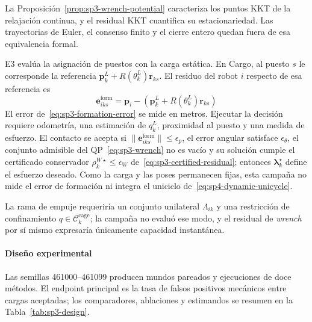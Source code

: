 La Proposición~\ref{prop:sp3-wrench-potential} caracteriza los puntos KKT de la relajación continua, y el residual KKT cuantifica su estacionariedad. Las trayectorias de Euler, el consenso finito y el cierre entero quedan fuera de esa equivalencia formal.

E3 evalúa la asignación de puestos con la carga estática. En Cargo, al puesto $s$ le corresponde la referencia $\boldsymbol p_k^L+R(\theta_k^L)\boldsymbol r_{ks}$. El residuo del robot $i$ respecto de esa referencia es
\begin{equation}
\label{eq:sp3-formation-error}
  \boldsymbol e_{iks}^{\mathrm{form}}
  =\boldsymbol p_i-
   \left(\boldsymbol p_k^L+R(\theta_k^L)\boldsymbol r_{ks}\right)
\end{equation}
El error de~\eqref{eq:sp3-formation-error} se mide en metros. Ejecutar la decisión requiere odometría, una estimación de $q_k^L$, proximidad al puesto y una medida de esfuerzo. El contacto se acepta si $\|\boldsymbol e_{iks}^{\mathrm{form}}\|\leq\epsilon_p$, el error angular satisface $\epsilon_\theta$, el conjunto admisible del QP~\eqref{eq:sp3-wrench} no es vacío y su solución cumple el certificado conservador $\rho_k^{W\star}\leq\epsilon_W$ de~\eqref{eq:sp3-certified-residual}; entonces $\boldsymbol\lambda_k^\star$ define el esfuerzo deseado. Como la carga y las poses permanecen fijas, esta campaña no mide el error de formación ni integra el uniciclo de~\eqref{eq:sp4-dynamic-unicycle}.

La rama de empuje requeriría un conjunto unilateral $\Lambda_{ik}$ y una restricción de confinamiento $q\in\mathcal C_k^{\mathrm{cage}}$; la campaña no evaluó ese modo, y el residual de \emph{wrench} por sí mismo expresaría únicamente capacidad instantánea.

\paragraph{Diseño experimental}

Las semillas 461000--461099 producen \SPThreeWorlds{} mundos pareados y \SPThreeRuns{} ejecuciones de doce métodos. El endpoint principal es la tasa de falsos positivos mecánicos entre cargas aceptadas; los comparadores, ablaciones y estimandos se resumen en la Tabla~\ref{tab:sp3-design}.

